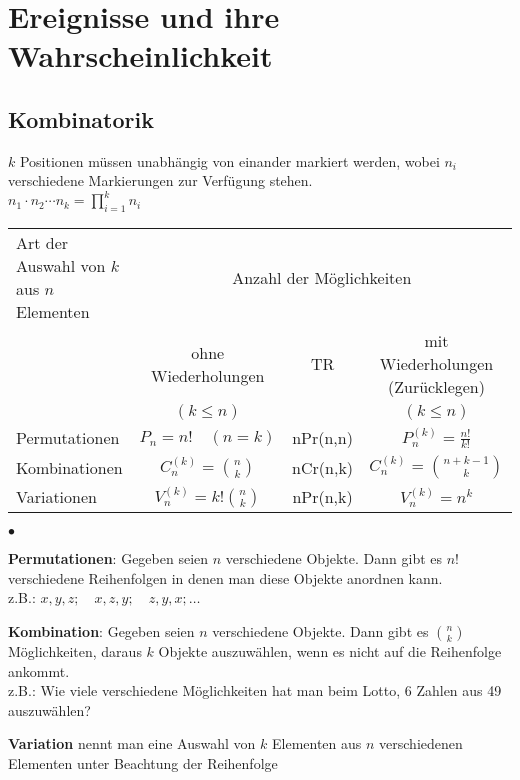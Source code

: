 \section{Ereignisse und ihre Wahrscheinlichkeit}

\subsection{Kombinatorik \skript{\pageref{sk-chapter-kombinatorik}}}
$k$ Positionen müssen unabhängig von einander markiert werden, wobei $n_i$ verschiedene Markierungen zur Verfügung stehen.\\
$n_1 \cdot n_2 \cdots n_k =  \prod_{i=1}^{k} n_i$\\
\begin{tabular}{| p{6cm} | c | c || c |}
  \hline
  Art der Auswahl von $k$ aus $n$ Elementen &
  \multicolumn{3}{c|}{Anzahl der Möglichkeiten} \\
  \cline{2-4}
  & ohne Wiederholungen & TR & mit Wiederholungen (Zurücklegen) \\
 	&	$(k\leq n)$   &      & $(k\leq n)$ \\
 	\hline
 	Permutationen & $P_n=n!\quad(n=k)$       & nPr(n,n) & $P_n^{(k)}=\frac{n!}{k!}$ \\
 	Kombinationen & $C_n^{(k)}=\binom n k$   & nCr(n,k) & $C_n^{(k)}=\binom{n+k-1} k$ \\
  Variationen   & $V_n^{(k)}=k!\binom n k$ & nPr(n,k) & $V_n^{(k)}=n^k$ \\
  \hline
\end{tabular}
\begin{list}{$\bullet$}{\setlength{\itemsep}{0cm} \setlength{\parsep}{0cm}
\setlength{\topsep}{0.1cm}}
  \item \textbf{Permutationen}: Gegeben seien $n$ verschiedene Objekte. Dann
    gibt es $n!$ verschiedene Reihenfolgen in denen man diese Objekte anordnen
    kann. \\
    z.B.: $x,y,z;\quad x,z,y;\quad z,y,x;\ldots$
  \item \textbf{Kombination}: Gegeben seien $n$ verschiedene Objekte. Dann gibt
    es $\binom n k$ Möglichkeiten, daraus $k$ Objekte auszuwählen, wenn es nicht
    auf die Reihenfolge ankommt. \\
    z.B.: Wie viele verschiedene Möglichkeiten hat man beim Lotto, 6 Zahlen aus
    49 auszuwählen?
  \item \textbf{Variation} nennt man eine Auswahl von $k$ Elementen aus $n$
    verschiedenen Elementen unter Beachtung der Reihenfolge
\end{list}
